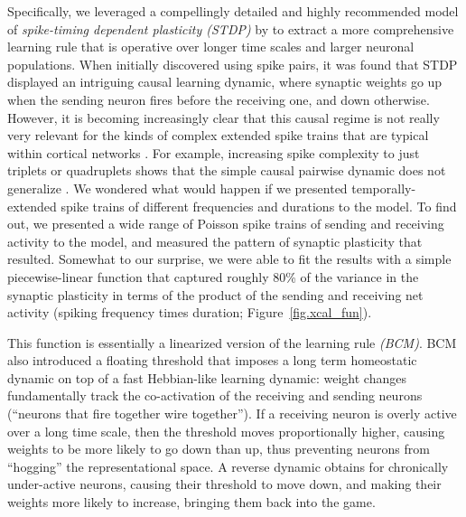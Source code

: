 \documentclass[11pt,twoside]{article}
\begin{document}
Specifically, we leveraged a compellingly detailed and highly recommended
model of {\em spike-timing dependent plasticity (STDP)} by
 to extract a more comprehensive learning
rule that is operative over longer time scales and larger neuronal
populations. When initially discovered using spike pairs, it was found that
STDP displayed an intriguing causal learning dynamic, where synaptic weights
go up when the sending neuron fires before the receiving one, and down
otherwise. However, it is becoming increasingly clear that this causal regime
is not really very relevant for the kinds of complex extended spike trains
that are typical within cortical networks
\cite{FroemkeDan02,RubinGerkinBiEtAl05,ShouvalWangWittenberg10,WangGerkinNauenEtAl05}.
For example, increasing spike complexity to just triplets or quadruplets shows
that the simple causal pairwise dynamic does not generalize
\cite{FroemkeDan02,RubinGerkinBiEtAl05,WangGerkinNauenEtAl05}.  We wondered
what would happen if we presented temporally-extended spike trains of
different frequencies and durations to the 
model.  To find out, we presented a wide range of Poisson spike trains of
sending and receiving activity to the model, and measured the pattern of
synaptic plasticity that resulted.  Somewhat to our surprise, we were able to
fit the results with a simple piecewise-linear function that captured roughly
80\% of the variance in the synaptic plasticity in terms of the product of the
sending and receiving net activity (spiking frequency times duration;
Figure~\ref{fig.xcal_fun}).

This function is essentially a linearized version of the
 learning rule {\em (BCM)}. BCM also
introduced a floating threshold that imposes a long term homeostatic dynamic
on top of a fast Hebbian-like learning dynamic: weight changes fundamentally
track the co-activation of the receiving and sending neurons (``neurons that
fire together wire together'').  If a receiving neuron is overly active over a
long time scale, then the threshold moves proportionally higher, causing
weights to be more likely to go down than up, thus preventing neurons from
``hogging'' the representational space.  A reverse dynamic obtains for
chronically under-active neurons, causing their threshold to move down, and
making their weights more likely to increase, bringing them back into the
game.
\end{document}
